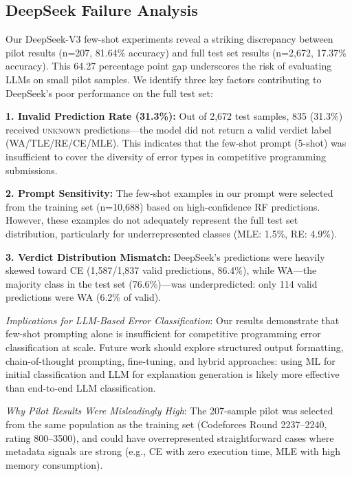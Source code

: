 \documentclass[10pt,a4paper]{article}
\begin{document}
\subsection{DeepSeek Failure Analysis}

Our DeepSeek-V3 few-shot experiments reveal a striking discrepancy between
pilot results (n=207, 81.64\% accuracy) and full test set results (n=2,672,
17.37\% accuracy). This 64.27 percentage point gap underscores the risk of
evaluating LLMs on small pilot samples. We identify three key factors
contributing to DeepSeek's poor performance on the full test set:

\textbf{1. Invalid Prediction Rate (31.3\%):} Out of 2,672 test samples, 835
(31.3\%) received \textsc{unknown} predictions---the model did not return a
valid verdict label (WA/TLE/RE/CE/MLE). This indicates that the few-shot
prompt (5-shot) was insufficient to cover the diversity of error types in
competitive programming submissions.

\textbf{2. Prompt Sensitivity:} The few-shot examples in our prompt were
selected from the training set (n=10,688) based on high-confidence RF
predictions. However, these examples do not adequately represent the full test
set distribution, particularly for underrepresented classes (MLE: 1.5\%,
RE: 4.9\%).

\textbf{3. Verdict Distribution Mismatch:} DeepSeek's predictions were heavily
skewed toward CE (1,587/1,837 valid predictions, 86.4\%), while WA---the
majority class in the test set (76.6\%)---was underpredicted: only 114 valid
predictions were WA (6.2\% of valid).

\textit{Implications for LLM-Based Error Classification}: Our results
demonstrate that few-shot prompting alone is insufficient for competitive
programming error classification at scale. Future work should explore
structured output formatting, chain-of-thought prompting, fine-tuning,
and hybrid approaches: using ML for initial classification and LLM for
explanation generation is likely more effective than end-to-end LLM
classification.

\textit{Why Pilot Results Were Misleadingly High}: The 207-sample pilot was
selected from the same population as the training set (Codeforces Round
2237--2240, rating 800--3500), and could have overrepresented straightforward
cases where metadata signals are strong (e.g., CE with zero execution time,
MLE with high memory consumption).
\end{document}
